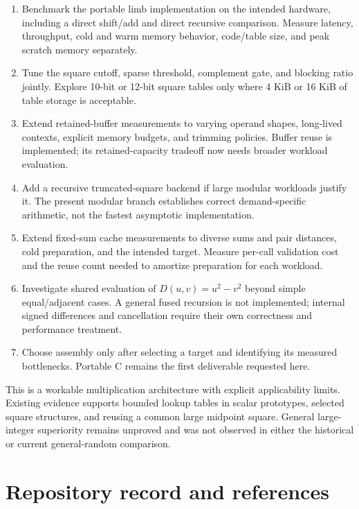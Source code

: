 \documentclass[11pt,a4paper]{article}
\begin{document}
\begin{enumerate}
\item Benchmark the portable limb implementation on the intended hardware, including a direct shift/add and direct recursive comparison. Measure latency, throughput, cold and warm memory behavior, code/table size, and peak scratch memory separately.
\item Tune the square cutoff, sparse threshold, complement gate, and blocking ratio jointly. Explore 10-bit or 12-bit square tables only where 4 KiB or 16 KiB of table storage is acceptable.
\item Extend retained-buffer measurements to varying operand shapes, long-lived contexts, explicit memory budgets, and trimming policies. Buffer reuse is implemented; its retained-capacity tradeoff now needs broader workload evaluation.
\item Add a recursive truncated-square backend if large modular workloads justify it. The present modular branch establishes correct demand-specific arithmetic, not the fastest asymptotic implementation.
\item Extend fixed-sum cache measurements to diverse sums and pair distances, cold preparation, and the intended target. Measure per-call validation cost and the reuse count needed to amortize preparation for each workload.
\item Investigate shared evaluation of $D(u,v)=u^2-v^2$ beyond simple equal/adjacent cases. A general fused recursion is not implemented; internal signed differences and cancellation require their own correctness and performance treatment.
\item Choose assembly only after selecting a target and identifying its measured bottlenecks. Portable C remains the first deliverable requested here.
\end{enumerate}

This is a workable multiplication architecture with explicit applicability limits. Existing evidence supports bounded lookup tables in scalar prototypes, selected square structures, and reusing a common large midpoint square. General large-integer superiority remains unproved and was not observed in either the historical or current general-random comparison.

\section{Repository record and references}
\end{document}
